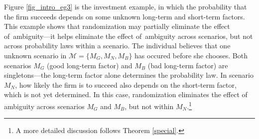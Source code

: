 \documentclass[12pt, notitlepage]{article}
\begin{document}
Figure \ref{fig_intro_eg3} is the investment example, in which the
probability that the firm succeeds depends on some unknown long-term and
short-term factors. This example shows that randomization may partially
eliminate the effect of\ ambiguity---it helps eliminate the effect of\
ambiguity across scenarios, but not across probability laws within a
scenario. The individual believes that one unknown scenario in $\mathcal{M}%
=\{M_{G},M_{N},M_{B}\}$ has occured before she chooses. Both scenarios $%
M_{G} $ (good long-term factor) and $M_{B}$ (bad long-term factor) are
singletons---the long-term factor alone determines the probability law. In
scenario $M_{N}$, how likely the firm is to succeed also depends on the
short-term factor, which is not yet determined. In this case, randomization
eliminates the effect of ambiguity across scenarios $M_{G}$ and $M_{B}$, but
not within $M_{N}$.\footnote{%
A more detailed discussion follows Theorem \ref{special}.}

\end{document}
